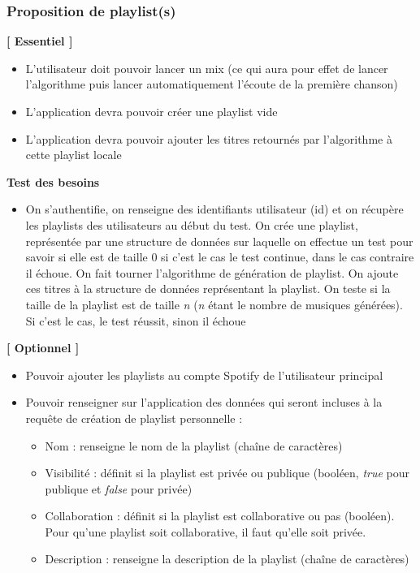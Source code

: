 \documentclass{article}
\begin{document}
		\subsubsection{Proposition de playlist(s)}
		\textbf{[ Essentiel ]}
		\begin{itemize}
			\item L'utilisateur doit pouvoir lancer un mix (ce qui aura pour effet de lancer l'algorithme puis lancer automatiquement l'écoute de la première chanson)
			\item L'application devra pouvoir créer une playlist vide
			\item L'application devra pouvoir ajouter les titres retournés par l'algorithme à cette playlist locale
		\end{itemize}
		\textbf{Test des besoins}
		\begin{itemize}
			\item On s'authentifie, on renseigne des identifiants utilisateur (id) et on récupère les playlists des utilisateurs au début du test. On crée une playlist, représentée par une structure de données sur laquelle on effectue un test pour savoir si elle est de taille 0 si c'est le cas le test continue, dans le cas contraire il échoue. On fait tourner l'algorithme de génération de playlist. On ajoute ces titres à la structure de données représentant la playlist. On teste si la taille de la playlist est de taille \textit{n} (\textit{n} étant le nombre de musiques générées). Si c'est le cas, le test réussit, sinon il échoue
		\end{itemize}
		\textbf{[ Optionnel ]}
		\begin{itemize}
			\item Pouvoir ajouter les playlists au compte Spotify de l'utilisateur principal
			\item Pouvoir renseigner sur l'application des données qui seront incluses à la requête de création de playlist personnelle : 
			      \begin{itemize}
			      	\item Nom : renseigne le nom de la playlist (chaîne de caractères)
			      	\item Visibilité : définit si la playlist est privée ou publique (booléen, \textit{true} pour publique et \textit{false} pour privée)
			      	\item Collaboration : définit si la playlist est collaborative ou pas (booléen). Pour qu'une playlist soit collaborative, il faut qu'elle soit privée.
			      	\item Description : renseigne la description de la playlist (chaîne de caractères)
			      \end{itemize}
		\end{itemize}
\end{document}
